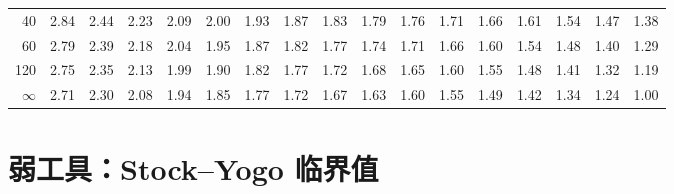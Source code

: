 \begin{center}
\begin{tabular}{r|cccccccccccccccc}
40 & 2.84 & 2.44 & 2.23 & 2.09 & 2.00 & 1.93 & 1.87 & 1.83 & 1.79 & 1.76 & 1.71 & 1.66 & 1.61 & 1.54 & 1.47 & 1.38\\
60 & 2.79 & 2.39 & 2.18 & 2.04 & 1.95 & 1.87 & 1.82 & 1.77 & 1.74 & 1.71 & 1.66 & 1.60 & 1.54 & 1.48 & 1.40 & 1.29\\
120 & 2.75 & 2.35 & 2.13 & 1.99 & 1.90 & 1.82 & 1.77 & 1.72 & 1.68 & 1.65 & 1.60 & 1.55 & 1.48 & 1.41 & 1.32 & 1.19\\
$\infty$ & 2.71 & 2.30 & 2.08 & 1.94 & 1.85 & 1.77 & 1.72 & 1.67 & 1.63 & 1.60 & 1.55 & 1.49 & 1.42 & 1.34 & 1.24 & 1.00\\\bottomrule
\end{tabular}\end{center}
\section{弱工具：Stock--Yogo 临界值}
